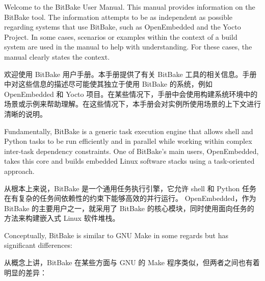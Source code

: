 % 
% 
% 


 Welcome to the BitBake User Manual. This manual provides information on the BitBake tool. The information attempts to be as independent as possible regarding systems that use BitBake, such as OpenEmbedded and the Yocto Project. In some cases, scenarios or examples within the context of a build system are used in the manual to help with understanding. For these cases, the manual clearly states the context.

 欢迎使用 BitBake 用户手册。本手册提供了有关 BitBake 工具的相关信息。手册中对这些信息的描述尽可能使其独立于使用 BitBake 的系统，例如 OpenEmbedded 和 Yocto 项目。在某些情况下，手册中会使用构建系统环境中的场景或示例来帮助理解。在这些情况下，本手册会对实例所使用场景的上下文进行清晰的说明。

 Fundamentally, BitBake is a generic task execution engine that allows shell and Python tasks to be run efficiently and in parallel while working within complex inter-task dependency constraints. One of BitBake's main users, OpenEmbedded, takes this core and builds embedded Linux software stacks using a task-oriented approach.

 从根本上来说，BitBake 是一个通用任务执行引擎，它允许 shell 和 Python 任务在有复杂的任务间依赖性的约束下能够高效的并行运行。 OpenEmbedded，作为 BitBake 的主要用户之一，就采用了 BitBake 的核心模块，同时使用面向任务的方法来构建嵌入式 Linux 软件堆栈。

 Conceptually, BitBake is similar to GNU Make in some regards but has significant differences:

 从概念上讲，BitBake 在某些方面与 GNU 的 Make 程序类似，但两者之间也有着明显的差异：

